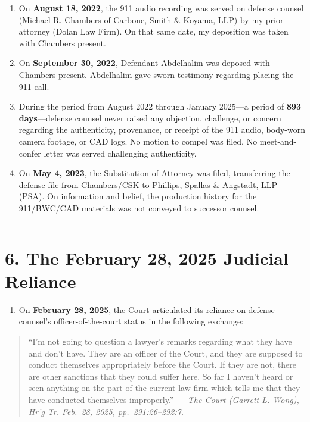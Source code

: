 \begin{enumerate}
\def\labelenumi{\arabic{enumi}.}
\setcounter{enumi}{10}
\item
  On \textbf{August 18, 2022}, the 911 audio recording was served on defense counsel (Michael R. Chambers of Carbone, Smith \& Koyama, LLP) by my prior attorney (Dolan Law Firm). On that same date, my deposition was taken with Chambers present.
\item
  On \textbf{September 30, 2022}, Defendant Abdelhalim was deposed with Chambers present. Abdelhalim gave sworn testimony regarding placing the 911 call.
\item
  During the period from August 2022 through January 2025---a period of \textbf{893 days}---defense counsel never raised any objection, challenge, or concern regarding the authenticity, provenance, or receipt of the 911 audio, body-worn camera footage, or CAD logs. No motion to compel was filed. No meet-and-confer letter was served challenging authenticity.
\item
  On \textbf{May 4, 2023}, the Substitution of Attorney was filed, transferring the defense file from Chambers/CSK to Phillips, Spallas \& Angstadt, LLP (PSA). On information and belief, the production history for the 911/BWC/CAD materials was not conveyed to successor counsel.
\end{enumerate}

\begin{center}\rule{0.5\linewidth}{0.5pt}\end{center}

\section{6. The February 28, 2025 Judicial Reliance}\label{the-february-28-2025-judicial-reliance}

\begin{enumerate}
\def\labelenumi{\arabic{enumi}.}
\setcounter{enumi}{14}
\tightlist
\item
  On \textbf{February 28, 2025}, the Court articulated its reliance on defense counsel's officer-of-the-court status in the following exchange:
\end{enumerate}

\begin{quote}
``I'm not going to question a lawyer's remarks regarding what they have and don't have. They are an officer of the Court, and they are supposed to conduct themselves appropriately before the Court. If they are not, there are other sanctions that they could suffer here. So far I haven't heard or seen anything on the part of the current law firm which tells me that they have conducted themselves improperly.'' --- \emph{The Court (Garrett L. Wong), Hr'g Tr. Feb.~28, 2025, pp.~291:26--292:7.}
\end{quote}

